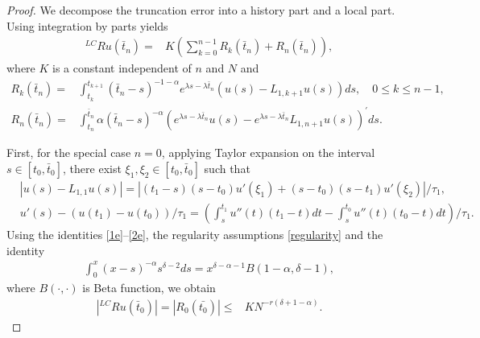 \documentclass[10pt, reqno]{amsart}
\theoremstyle{remark}
\theoremstyle{definition}
\numberwithin{table}{section}
\begin{document}
\begin{proof}We decompose the truncation error into a history part and a local part. Using integration by parts yields
    \begin{align}\label{R1}
        {}^{LC}Ru(\bar{t}_n)
        = &K(\sum_{k=0}^{n-1}R_{k}(\bar{t}_n)+R_{n}(\bar{t}_n)),
    \end{align}
where $K$ is a constant independent of $n$ and $N$ and 
\begin{align}
    R_{k}(\bar{t}_n)=&\int_{t_k}^{t_{k+1}}{(\bar{t}_n-s)^{-1-\alpha}}e^{\lambda s-\lambda \bar{t}_n}(u(s)-L_{1, k+1}u(s))ds,\quad 0\leq k\leq n-1, \label{hist1}\\
        R_{n}(\bar{t}_n)=&\int_{t_n}^{\bar{t}_n}\alpha (\bar{t}_n-s)^{-\alpha}(e^{\lambda s-\lambda \bar{t}_n}u(s)-e^{\lambda s-\lambda \bar{t}_n}L_{1, n+1}u(s))^{\prime} ds.\label{local1}
\end{align}

First, for the special case \(n=0\), applying Taylor expansion on the interval \(s \in [t_0, \bar{t}_0]\), there exist \(\xi_1, \xi_2 \in [t_0, \bar{t}_0]\) such that
\begin{align}
    &|u(s)-L_{1, 1}u(s)|
    =|{(t_1-s)(s-t_0)}u'(\xi_1)+{(s-t_0)(s-t_1)}u'(\xi_2)|/{\tau_1}
    ,\label{1e}\\
    &u'(s)-(u(t_1)-u(t_0))/{\tau_1}=(\int_s^{t_{1}}u''(t)(t_{1}-t)dt-\int_s^{t_{0}}u''(t)(t_{0}-t)dt)/{\tau_1}.\label{2e}
\end{align}
Using the identities \eqref{1e}–\eqref{2e}, the regularity assumptions \eqref{regularity} and the identity
\begin{align*}
    \int_0^x (x-s)^{-\alpha}s^{\delta-2} ds=x^{\delta-\alpha-1} B(1-\alpha,\delta-1),
\end{align*}
where $B(\cdot,\cdot)$ is Beta function, we obtain
\begin{align}
|{}^{LC}Ru(\bar{t}_0)|=|R_{0}(\bar{t_0})|
\leq &KN^{-r(\delta+1-\alpha)}.\label{gamma}
\end{align}


\end{proof}
\end{document}
